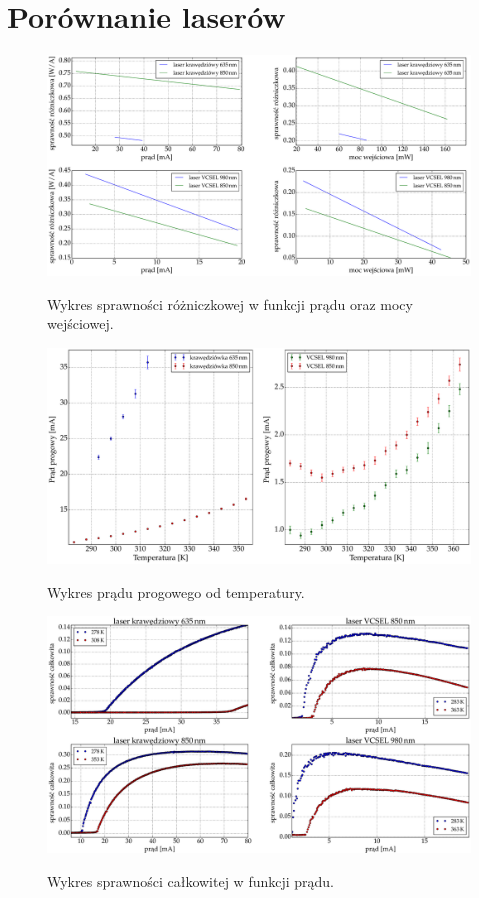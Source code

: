 \section{Porównanie laserów}
\begin{figure}
\center
  \includegraphics[scale=0.30]{plot_common/plot_eff.eps}
  \label{rys1}
  \caption{Wykres sprawności różniczkowej w funkcji prądu oraz mocy wejściowej.}
\end{figure}
\begin{figure}
\center
  \includegraphics[scale=0.30]{plot_common/plot_temp_i_th.eps}
  \label{rys1}
  \caption{Wykres prądu progowego od temperatury.}
\end{figure}
\begin{figure}
\center
  \includegraphics[scale=0.30]{plot_common/plot_wall_eff.eps}
  \label{rys1}
  \caption{Wykres sprawności całkowitej w funkcji prądu.}
\end{figure}
